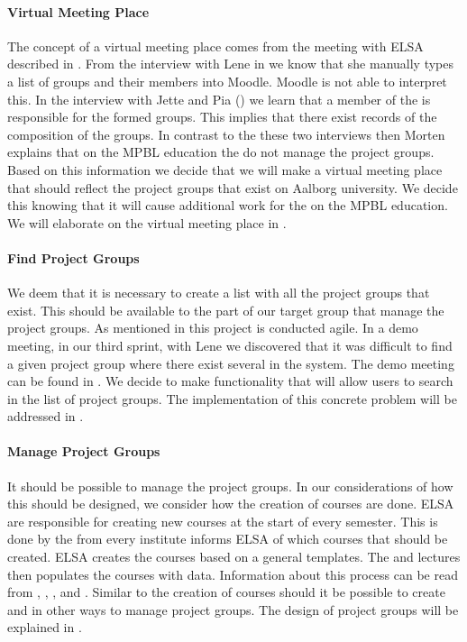 \paragraph{Virtual Meeting Place}
The concept of a virtual meeting place comes from the meeting with ELSA described in . 
From the interview with Lene in  we know that she manually types a list of groups and their members into Moodle.
Moodle is not able to interpret this. 
In the interview with Jette and Pia () we learn that a member of the \admpers{} is responsible for the formed groups. 
This implies that there exist records of the composition of the groups.   
In contrast to the these two interviews then Morten explains that on the MPBL education the \admpers{} do not manage the project groups.
Based on this information we decide that we will make a virtual meeting place that should reflect the project groups that exist on Aalborg university. 
We decide this knowing that it will cause additional work for the \admpers{} on the MPBL education. 
We will elaborate on the virtual meeting place in .

\paragraph{Find Project Groups}
We deem that it is necessary to create a list with all the project groups that exist.
This should be available to the part of our target group that manage the project groups.
As mentioned in  this project is conducted agile. 
In a demo meeting, in our third sprint, with Lene we discovered that it was difficult to find a given project group where there exist several in the system.
The demo meeting can be found in . 
We decide to make functionality that will allow users to search in the list of project groups.
The implementation of this concrete problem will be addressed in .

\paragraph{Manage Project Groups}
It should be possible to manage the project groups. In our considerations of how this should be designed, we consider how the creation of courses are done. 
ELSA are responsible for creating new courses at the start of every semester. 
This is done by the \admpers{} from every institute informs ELSA of which courses that should be created. 
ELSA creates the courses based on a general templates.
The \admpers{} and lectures then populates the courses with data. 
Information about this process can be read from , ,  , and .
Similar to the creation of courses should it be possible to create and in other ways to manage project groups. 
The design of project groups will be explained in . \\

